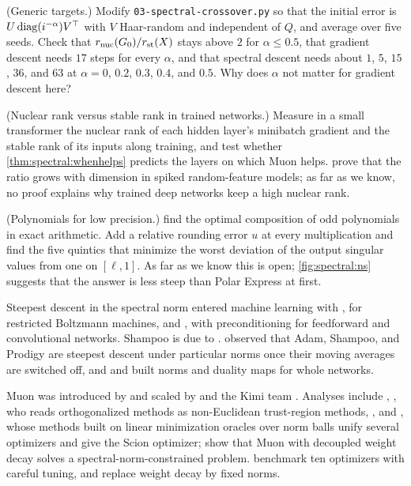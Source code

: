 \begin{refsection}
\begin{exercises}
\item \simulation (Generic targets.) Modify \texttt{03-spectral-crossover.py} so that the initial error is $U\operatorname{diag}(i^{-\alpha})V^\top$ with $V$ Haar-random and independent of $Q$, and average over five seeds. Check that $r_{\mathrm{nuc}}(G_0)/r_{\mathrm{st}}(X)$ stays above $2$ for $\alpha\le0.5$, that gradient descent needs $17$ steps for every $\alpha$, and that spectral descent needs about $1$, $5$, $15$, $36$, and $63$ at $\alpha=0$, $0.2$, $0.3$, $0.4$, and $0.5$. Why does $\alpha$ not matter for gradient descent here?\label{ex:spectral:generic}

\item \research (Nuclear rank versus stable rank in trained networks.) Measure in a small transformer the nuclear rank of each hidden layer's minibatch gradient and the stable rank of its inputs along training, and test whether \cref{thm:spectral:whenhelps} predicts the layers on which Muon helps. \Textcite{DavisDrusvyatskiy2025} prove that the ratio grows with dimension in spiked random-feature models; as far as we know, no proof explains why trained deep networks keep a high nuclear rank.\label{ex:spectral:research1}

\item \research (Polynomials for low precision.) \Textcite{AmselEtAl2026} find the optimal composition of odd polynomials in exact arithmetic. Add a relative rounding error $u$ at every multiplication and find the five quintics that minimize the worst deviation of the output singular values from one on $[\ell,1]$. As far as we know this is open; \cref{fig:spectral:ns} suggests that the answer is less steep than Polar Express at first.\label{ex:spectral:research2}
\end{exercises}

\notesandrefs
Steepest descent in the spectral norm entered machine learning with \textcite{CarlsonEtAl2015a}, for restricted Boltzmann machines, and \textcite{CarlsonEtAl2015b}, with preconditioning for feedforward and convolutional networks. Shampoo is due to \textcite{GuptaKorenSinger2018}. \Textcite{BernsteinNewhouse2024} observed that Adam, Shampoo, and Prodigy are steepest descent under particular norms once their moving averages are switched off, and \textcite{BernsteinNewhouse2025} and \textcite{LargeEtAl2024} built norms and duality maps for whole networks.

Muon was introduced by \textcite{JordanEtAl2024Muon} and scaled by \textcite{LiuEtAl2025Muon} and the Kimi team \parencite{KimiTeam2025}. Analyses include \textcite{LiHong2025}, \textcite{Kovalev2025}, who reads orthogonalized methods as non-Euclidean trust-region methods, \textcite{ShenEtAl2025}, and \textcite{PethickEtAl2025}, whose methods built on linear minimization oracles over norm balls unify several optimizers and give the Scion optimizer; \textcite{ChenLiLiu2026} show that Muon with decoupled weight decay solves a spectral-norm-constrained problem. \Textcite{WenEtAl2026Fantastic} benchmark ten optimizers with careful tuning, and \textcite{WenEtAl2026Hyperball} replace weight decay by fixed norms.


\end{refsection}
